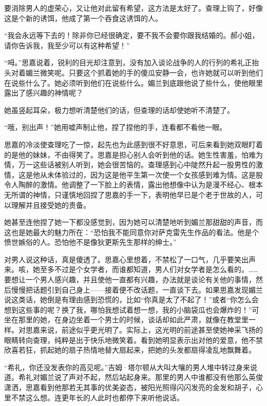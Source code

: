 \par 要消除男人的虚荣心，又让他对此留有希望，这方法是太好了。查理上钩了，好像这是个新的诱饵，他成了第一个吞食这诱饵的人。
\par “我会永远等下去的！除非你已经很确定，要不我不会要你跟我结婚的。郝小姐，请你告诉我，我至少可以有这种希望！”
\par “呣。”思嘉说着，锐利的目光却注意到，没有加入谈论战争的人的行列的希礼正抬头对着媚兰微笑呢。只要这个抓着她的手的傻瓜安静一会，也许她就可以听到他们在说些什么了。她必须听到他们在说些什么。媚兰到底跟他说了些什么，使他眼里露出了感兴趣的神情呢？
\par 她虽竖起耳朵，极力想听清楚他们的话，但查理的话却使她听不清楚了。
\par “哦，别出声！”她用嘘声制止他，捏了捏他的手，连看都不看他一眼。
\par 思嘉的冷淡使查理吃了一惊，起先也为此感到很不好意思，可后来看到她双眼盯着的是他的妹妹，不由得笑了。思嘉是担心别人会听到他的话。她生性害羞，怕难为情，万一这些话被别人听到，她会很苦恼的。查理感到心中陡然升起一股男性的激情，这是他从未体验过的，因为这是他平生第一次使一个女孩感到难为情。这是股令人陶醉的激情。他调整了一下脸上的表情，露出他想像中认为是漫不经心、根本无所谓的神情，只谨慎地回捏了思嘉的手一下，表明他早已是个老于世故的人，可以理解并且接受她的责备。
\par 她甚至连他捏了她一下都没感觉到，因为她可以清楚地听到媚兰那甜甜的声音，而这也是她最大的魅力所在：“恐怕我不能同意你对萨克雷先生作品的看法。他是个愤世嫉俗的人。恐怕他不是像狄更斯先生那样的绅士。”
\par 对男人说这种话，真是傻透了。思嘉心里想着，不禁松了一口气，几乎要笑出声来。咳，她至多不过是个女学者，而谁都知道，男人们对女学者是怎么看的。……要想让一个男人感兴趣，并且使他一直都有兴趣，办法就是谈论有关他的事情，然后慢慢把话题引到自己身上——接着便不改话题，一直谈下去。如果思嘉发现媚兰说这类话，她倒是有理由感到恐慌的，比如“你真是太了不起了！”或者“你怎么会想到这些事的呢？换了我，哪怕我想试着想一想，我的小脑袋瓜也会爆炸的！”可坐在那里的她，在身边坐着一个男士的时候，谈话却如此严肃，就像在教堂里一样。对思嘉来说，前途似乎更光明了。实际上，这光明的前途甚至使她神采飞扬的眼睛转向查理，纯粹是出于快乐地微笑着。看到她明显表示出对他的爱意，他不禁欣喜若狂，抓起她的扇子热情地替大扇起来，把她的头发都扇得凌乱地飘舞着。
\par “希礼，你还没发表你的高见呢。”吉姆·塔尔顿从大叫大嚷的男人堆中转过身来说道。希礼对媚兰说了声对不起，然后站起身来。那里的男人中谁都没有他那么英俊潇洒，思嘉看到他那若无其事的优美姿态，被阳光照得闪闪发亮的金发和胡子，心里不禁这么想。连更年长的人此时也都停下来听他说话。
